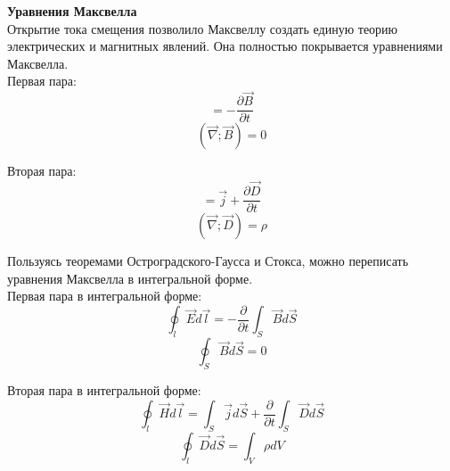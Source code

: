 \documentclass{article}
\begin{document}
	
	\textbf{Уравнения Максвелла}\\

	Открытие тока смещения позволило Максвеллу создать единую теорию электрических и магнитных явлений. Она полностью покрывается уравнениями Максвелла.\\

	Первая пара:
	\begin{equation}
		[\vec\nabla;\vec E] = -\frac{\partial \vec B}{\partial t}
	\end{equation}
	\begin{equation}
		(\vec\nabla;\vec B) = 0
	\end{equation}

	Вторая пара:
	\begin{equation}
		[\vec\nabla;\vec H] = \vec j + \frac{\partial\vec D}{\partial t}
	\end{equation}
	\begin{equation}
		(\vec\nabla;\vec D) = \rho
	\end{equation}

	Пользуясь теоремами Остроградского-Гаусса и Стокса, можно переписать уравнения Максвелла в интегральной форме.\\

	Первая пара в интегральной форме:
	\begin{equation}
		\oint_l \vec E d\vec l = -\frac{\partial}{\partial t}\int_S \vec B d\vec S
	\end{equation}
	\begin{equation}
		\oint_S \vec B d\vec S = 0
	\end{equation}

	Вторая пара в интегральной форме:
	\begin{equation}
		\oint_l \vec H d\vec l = \int_S \vec j d\vec S + \frac{\partial}{\partial t} \int_S \vec D d\vec S
	\end{equation}
	\begin{equation}
		\oint_l \vec D d\vec S = \int_V \rho dV
	\end{equation}
\end{document}
